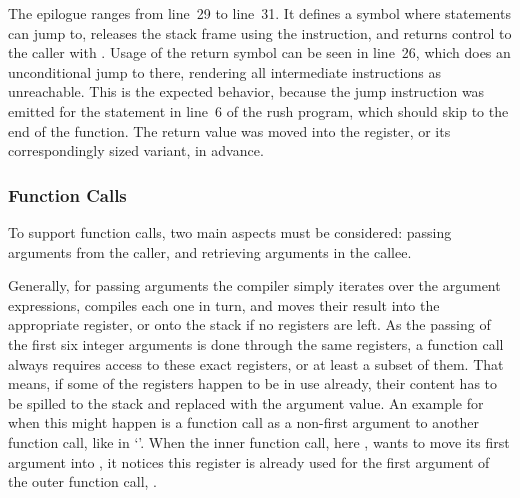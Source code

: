 
The epilogue ranges from line~29 to line~31.
It defines a symbol where  statements can jump to, releases the stack frame using the  instruction, and returns control to the caller with .
Usage of the return symbol can be seen in line~26, which does an unconditional jump to there, rendering all intermediate instructions as unreachable.
This is the expected behavior, because the jump instruction was emitted for the  statement in line~6 of the rush program, which should skip to the end of the function.
The return value was moved into the  register, or its correspondingly sized variant, in advance.


\subsubsection{Function Calls}


To support function calls, two main aspects must be considered: passing arguments from the caller, and retrieving arguments in the callee.

Generally, for passing arguments the compiler simply iterates over the argument expressions, compiles each one in turn, and moves their result into the appropriate register, or onto the stack if no registers are left.
As the passing of the first six integer arguments is done through the same registers, a function call always requires access to these exact registers, or at least a subset of them.
That means, if some of the registers happen to be in use already, their content has to be spilled to the stack and replaced with the argument value.
An example for when this might happen is a function call as a non-first argument to another function call, like in `'.
When the inner function call, here , wants to move its first argument  into , it notices this register is already used for the first argument of the outer function call, .

